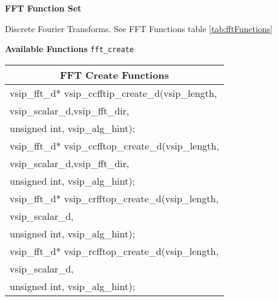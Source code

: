 \clearpage
{\large \textbf{\hypertarget{fftFunc}{FFT Function Set}}}\vspace{.2cm}\\
\hspace*{.3cm}
\parbox{0.85\textwidth}{Discrete Fourier Transforms. See FFT Functions table \ref{tab:fftFunctions}}
\cvsiplh 
\newline \hspace*{.8cm} \vspace*{.1cm} \textbf{Available Functions }
\newline \hspace*{.8cm} \vspace*{.1cm} \texttt{fft\_create}
\newline \hspace*{1.1cm} {
\ttfamily
\begin{tabular}[H]{l}\hline
\hline \multicolumn{1}{c}{\rmfamily \bfseries FFT Create Functions\vspace{.1cm}}\\ \hline
vsip\_fft\_d* vsip\_ccfftip\_create\_d(vsip\_length, \\*\hspace{.7cm}vsip\_scalar\_d,vsip\_fft\_dir,\\*\hspace{.7cm} unsigned int, vsip\_alg\_hint);\vspace{.1cm}\\
vsip\_fft\_d* vsip\_ccfftop\_create\_d(vsip\_length, \\*\hspace{.7cm}vsip\_scalar\_d,vsip\_fft\_dir,\\*\hspace{.7cm} unsigned int, vsip\_alg\_hint);\vspace{.1cm}\\
vsip\_fft\_d* vsip\_crfftop\_create\_d(vsip\_length,\\*\hspace{.7cm}vsip\_scalar\_d,\\*\hspace{.7cm}unsigned int, vsip\_alg\_hint);\vspace{.1cm}\\
vsip\_fft\_d* vsip\_rcfftop\_create\_d(vsip\_length,\\*\hspace{.7cm}vsip\_scalar\_d,\\*\hspace{.7cm}unsigned int, vsip\_alg\_hint);\vspace{.1cm}\\

\end{tabular}}
